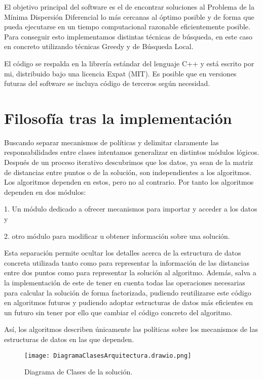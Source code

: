 El objetivo principal del software es el de encontrar soluciones al Problema de la Mínima Dispersión Diferencial lo más cercanas
al óptimo posible y de forma que pueda ejecutarse en un tiempo computacional razonable eficientemente posible. Para conseguir esto
implementamos distintas técnicas de búsqueda, en este caso en concreto utilizando técnicas Greedy y de Búsqueda Local.

El código se respalda en la librería estándar del lenguaje C++ y está escrito por mi, distribuido bajo una licencia Expat (MIT).
Es posible que en versiones futuras del software se incluya código de terceros según necesidad.

\section{Filosofía tras la implementación}

Buscando separar mecanismos de políticas y delimitar claramente las responsabilidades entre clases intentamos generalizar en
distintos módulos lógicos. Después de un proceso iterativo descubrimos que los datos, ya sean de la matriz de distancias
entre puntos o de la solución, son independientes a los algoritmos.
Los algoritmos dependen en estos, pero no al contrario. Por tanto los algoritmos dependen en dos módulos:

    1. Un módulo dedicado a ofrecer mecanismos para importar y acceder a los datos y
    
    2. otro módulo para modificar u obtener información sobre una solución.

Esta separación permite ocultar los detalles acerca de la estructura de datos concreta utilizada tanto como para representar
la información de las distancias entre dos puntos como para representar
la solución al algoritmo. Además, salva a la implementación de este de tener en cuenta todas las operaciones necesarias
para calcular la solución de forma factorizada, pudiendo reutilizarse este código en algoritmos futuros y pudiendo adoptar estructuras
de datos más eficientes en un futuro sin tener por ello que cambiar el código concreto del algoritmo.

Así, los algoritmos describen únicamente las políticas sobre los mecanismos de las estructuras de datos en las que dependen.

\begin{figure}[ht]
    \centering
    \texttt{[image: DiagramaClasesArquitectura.drawio.png]}
    \caption{Diagrama de Clases de la solución.}
\end{figure}


